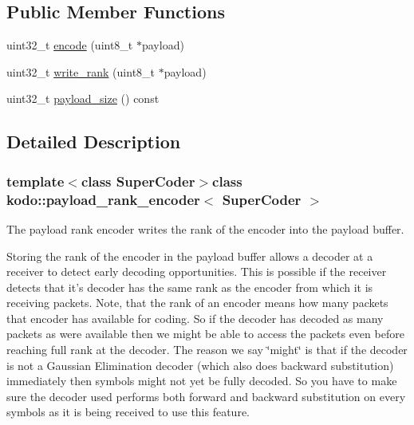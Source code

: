 \subsection*{Public Member Functions}
\begin{DoxyCompactItemize}
\item 
uint32\-\_\-t \hyperlink{classkodo_1_1payload__rank__encoder_aa1d4c6f711f755a0db2c466dee8c0d85}{encode} (uint8\-\_\-t $\ast$payload)
\begin{DoxyCompactList}\small\item\em \end{DoxyCompactList}\item 
uint32\-\_\-t \hyperlink{classkodo_1_1payload__rank__encoder_a5143c5528307613e3ff837ad32398989}{write\-\_\-rank} (uint8\-\_\-t $\ast$payload)
\item 
uint32\-\_\-t \hyperlink{classkodo_1_1payload__rank__encoder_a2cc3a54d259905711d90de0a86807c21}{payload\-\_\-size} () const 
\begin{DoxyCompactList}\small\item\em \end{DoxyCompactList}\end{DoxyCompactItemize}


\subsection{Detailed Description}
\subsubsection*{template$<$class Super\-Coder$>$class kodo\-::payload\-\_\-rank\-\_\-encoder$<$ Super\-Coder $>$}

The payload rank encoder writes the rank of the encoder into the payload buffer. 

Storing the rank of the encoder in the payload buffer allows a decoder at a receiver to detect early decoding opportunities. This is possible if the receiver detects that it's decoder has the same rank as the encoder from which it is receiving packets. Note, that the rank of an encoder means how many packets that encoder has available for coding. So if the decoder has decoded as many packets as were available then we might be able to access the packets even before reaching full rank at the decoder. The reason we say \char`\"{}might\char`\"{} is that if the decoder is not a Gaussian Elimination decoder (which also does backward substitution) immediately then symbols might not yet be fully decoded. So you have to make sure the decoder used performs both forward and backward substitution on every symbols as it is being received to use this feature. 

